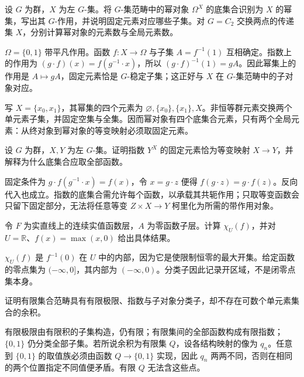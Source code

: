 \begin{exercise}\label{b4:ex:E-powerset}
	设 \(G\) 为群，\(X\) 为左 \(G\)-集。将 \(G\)-集范畴中的幂对象 \(\Omega^X\) 的底集合识别为 \(X\) 的幂集，写出其 \(G\)-作用，并说明固定元素对应哪些子集。对 \(G=C_2\) 交换两点的传递集 \(X\)，分别计算幂对象的元素数与全局元素数。
\end{exercise}
\begin{solution}
	\(\Omega=\{0,1\}\) 带平凡作用。函数 \(f:X\to\Omega\) 与子集 \(A=f^{-1}(1)\) 互相确定。指数上的作用为 \((g\cdot f)(x)=f(g^{-1}\cdot x)\)，所以 \((g\cdot f)^{-1}(1)=gA\)。因此幂集上的作用是 \(A\mapsto gA\)，固定元素恰是 \(G\)-稳定子集；这正好与 \(X\) 在 \(G\)-集范畴中的子对象对应。

	写 \(X=\{x_0,x_1\}\)，其幂集的四个元素为 \(\varnothing,\{x_0\},\{x_1\},X\)。非恒等群元素交换两个单元素子集，并固定空集与全集。因而幂对象有四个底集合元素，只有两个全局元素：从终对象到幂对象的等变映射必须取固定元素。
\end{solution}

\begin{exercise}\label{b4:ex:E-group-exponential}
	设 \(G\) 为群，\(X,Y\) 为左 \(G\)-集。证明指数 \(Y^X\) 的固定元素恰为等变映射 \(X\to Y\)，并解释为什么底集合应取全部函数。
\end{exercise}
\begin{solution}
	固定条件为 \(g\cdot f(g^{-1}\cdot x)=f(x)\)，令 \(x=g\cdot z\) 便得 \(f(g\cdot z)=g\cdot f(z)\)。反向代入也成立。指数的底集合需允许每个函数，以承载其共轭作用；只取等变函数会只留下固定部分，无法将任意等变 \(Z\times X\to Y\) 柯里化为所需的带作用对象。
\end{solution}

\begin{exercise}\label{b4:ex:E-classifier-zero-locus}
	令 \(F\) 为实直线上的连续实值函数层，\(A\) 为零函数子层。计算 \(\chi_U(f)\)，并对 \(U=\mathbb R\)、\(f(x)=\max(x,0)\) 给出具体结果。
\end{exercise}
\begin{solution}
	\(\chi_U(f)\) 是 \(f^{-1}(0)\) 在 \(U\) 中的内部，因为它是使限制恒零的最大开集。给定函数的零点集为 \(({-\infty},0]\)，其内部为 \(({-\infty},0)\)。分类子因此记录开区域，不是闭零点集本身。
\end{solution}

\begin{exercise}\label{b4:ex:E-finite-sets}
	证明有限集合范畴具有有限极限、指数与子对象分类子，却不存在可数个单元素集合的余积。
\end{exercise}
\begin{solution}
	有限极限由有限积的子集构造，仍有限；有限集间的全部函数构成有限指数；\(\{0,1\}\) 仍分类全部子集。若所说余积为有限集 \(Q\)，设各结构映射的像为 \(q_n\)。任意到 \(\{0,1\}\) 的取值族必须由函数 \(Q\to\{0,1\}\) 实现，因此 \(q_n\) 两两不同，否则在相同的两个位置指定不同值便矛盾。有限 \(Q\) 无法含这些点。
\end{solution}


